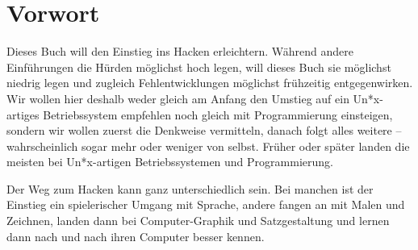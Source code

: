 
\chapter{Vorwort}

Dieses Buch will den Einstieg ins Hacken erleichtern. Während andere Einführungen die Hürden möglichst hoch legen, will dieses Buch sie möglichst niedrig legen und zugleich Fehlentwicklungen möglichst frühzeitig entgegenwirken. Wir wollen hier deshalb weder gleich am Anfang den Umstieg auf ein Un*x-artiges Betriebssystem empfehlen noch gleich mit Programmierung einsteigen, sondern wir wollen zuerst die Denkweise vermitteln, danach folgt alles weitere – wahrscheinlich sogar mehr oder weniger von selbst. Früher oder später landen die meisten bei Un*x-artigen Betriebssystemen und Programmierung.

Der Weg zum Hacken kann ganz unterschiedlich sein. Bei manchen ist der Einstieg ein spielerischer Umgang mit Sprache, andere fangen an mit Malen und Zeichnen, landen dann bei Computer-Graphik und Satzgestaltung und lernen dann nach und nach ihren Computer besser kennen.  